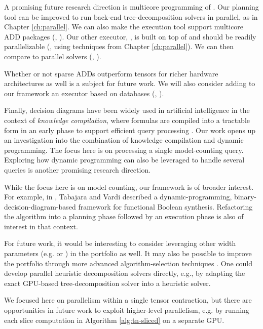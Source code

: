 A promising future research direction is multicore programming of \Dpmc{}.
Our planning tool \Lg{} can be improved to run back-end tree-decomposition solvers in parallel, as in Chapter \ref{ch:parallel}.
We can also make the execution tool \Dmc{} support multicore ADD packages (\eg, \sylvan{} \cite{van2015sylvan}).
Our other executor, \Tensor{}, is built on top of \Numpy{} \cite{numpy} and should be readily parallelizable (\eg, using techniques from Chapter \ref{ch:parallel}).
We can then compare \Dpmc{} to parallel solvers (\eg, \cite{dal2018parallel,BSB15}).

Whether or not sparse ADDs outperform tensors for richer hardware architectures as well is a subject for future work. %
We will also consider adding to our framework an executor based on databases (\eg, \cite{fichte2020exploiting}).

Finally, decision diagrams have been widely used in artificial intelligence in the context of \emph{knowledge compilation}, where formulas are compiled into a tractable form in an early phase to support efficient query processing \cite{koriche2013knowledge,LM17,darwiche2004new,OD15}.
Our work opens up an investigation into the combination of knowledge compilation and dynamic programming.
The focus here is on processing a single model-counting query.
Exploring how dynamic programming can also be leveraged to handle several queries is another promising research direction.

While the focus here is on model counting, our framework is of broader interest.
For example, in \cite{tabajara2017factored}, Tabajara and Vardi described a dynamic-programming, binary-decision-diagram-based framework for functional Boolean synthesis.
Refactoring the algorithm into a planning phase followed by an execution phase is also of interest in that context.


For future work, it would be interesting to consider leveraging other width parameters (e.g. \cite{AGG07} or \cite{GS17}) in the portfolio as well. It may also be possible to improve the portfolio through more advanced algorithm-selection techniques \cite{HHLKS09,XHHL12}. One could develop parallel heuristic decomposition solvers directly, e.g., by adapting the exact GPU-based tree-decomposition solver \cite{VB17} into a heuristic solver.

We focused here on parallelism within a single tensor contraction, but there are opportunities in future work to exploit higher-level parallelism, e.g. by running each slice computation in Algorithm \ref{alg:tn-sliced} on a separate GPU. 

